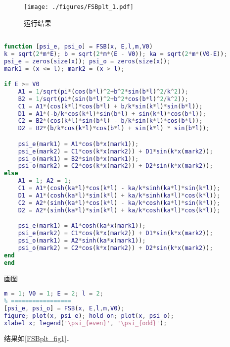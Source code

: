 
\begin{issues}
\issueDraft
\end{issues}


\begin{figure}[ht]
\centering
\texttt{[image: ./figures/FSBplt\_1.pdf]}
\caption{运行结果} \label{FSBplt_fig1}
\end{figure}

\begin{lstlisting}[language=matlab, caption=FSB.m]
% m 质量，V0 势垒，E 能量， L 势垒半宽;

function [psi_e, psi_o] = FSB(x, E,l,m,V0)
k = sqrt(2*m*E); b = sqrt(2*m*(E - V0)); ka = sqrt(2*m*(V0-E));
psi_e = zeros(size(x)); psi_o = zeros(size(x));
mark1 = (x <= l); mark2 = (x > l);

if E >= V0
    A1 = 1/sqrt(pi*(cos(b*l)^2+b^2*sin(b*l)^2/k^2));
    B2 = 1/sqrt(pi*(sin(b*l)^2+b^2*cos(b*l)^2/k^2));
    C1 = A1*(cos(k*l)*cos(b*l) + b/k*sin(k*l)*sin(b*l));
    D1 = A1*(-b/k*cos(k*l)*sin(b*l) + sin(k*l)*cos(b*l));
    C2 = B2*(cos(k*l)*sin(b*l) - b/k*sin(k*l)*cos(b*l));
    D2 = B2*(b/k*cos(k*l)*cos(b*l) + sin(k*l) * sin(b*l));

    psi_e(mark1) = A1*cos(b*x(mark1));
    psi_e(mark2) = C1*cos(k*x(mark2)) + D1*sin(k*x(mark2));
    psi_o(mark1) = B2*sin(b*x(mark1));
    psi_o(mark2) = C2*cos(k*x(mark2)) + D2*sin(k*x(mark2));
else
    A1 = 1; A2 = 1;
    C1 = A1*(cosh(ka*l)*cos(k*l) - ka/k*sinh(ka*l)*sin(k*l));
    D1 = A1*(cosh(ka*l)*sin(k*l) + ka/k*sinh(ka*l)*cos(k*l));
    C2 = A2*(sinh(ka*l)*cos(k*l) - ka/k*cosh(ka*l)*sin(k*l));
    D2 = A2*(sinh(ka*l)*sin(k*l) + ka/k*cosh(ka*l)*cos(k*l));

    psi_e(mark1) = A1*cosh(ka*x(mark1));
    psi_e(mark2) = C1*cos(k*x(mark2)) + D1*sin(k*x(mark2));
    psi_o(mark1) = A2*sinh(ka*x(mark1));
    psi_o(mark2) = C2*cos(k*x(mark2)) + D2*sin(k*x(mark2));
end
end
\end{lstlisting}

画图
\begin{lstlisting}[language=matlab]
% === 设置参数 =====
m = 1; V0 = 1; E = 2; l = 2;
% =================
[psi_e, psi_o] = FSB(x, E,l,m,V0);
figure; plot(x, psi_e); hold on; plot(x, psi_o);
xlabel x; legend('\psi_{even}', '\psi_{odd}');
\end{lstlisting}
结果如\autoref{FSBplt_fig1}．
